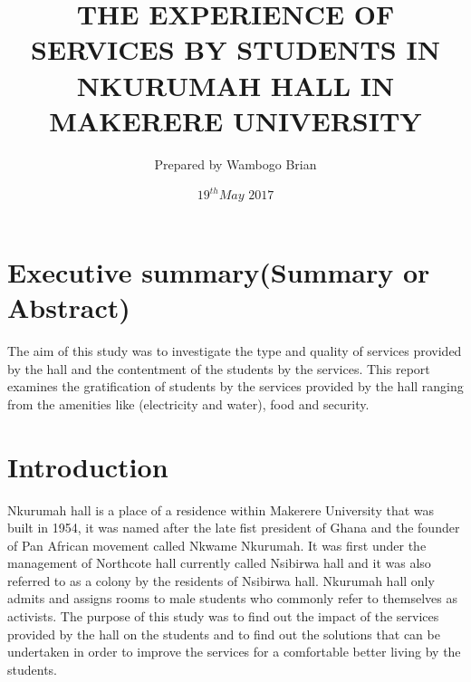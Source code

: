 \documentclass[12pt, a4paper]{article}
\title{THE EXPERIENCE OF SERVICES BY STUDENTS IN NKURUMAH HALL IN MAKERERE UNIVERSITY}
\author{Prepared by Wambogo Brian}
\date{$19^{th} May$ $ 2017$}
\begin{document}
\maketitle
\clearpage
\section{Executive summary(Summary or Abstract)}
The aim of this study was to investigate  the type and quality of services  provided by the hall and the contentment of the students by the services. This report examines the gratification of students by the services provided by the hall ranging from the amenities like (electricity and water), food and security.
\section{Introduction}
Nkurumah hall is a place of a residence within Makerere University that was built in 1954, it was named after the late fist president of Ghana and the founder of Pan African movement called Nkwame Nkurumah. It was first under the management of Northcote hall currently called Nsibirwa hall and it was also referred to as a colony by the residents of Nsibirwa hall. Nkurumah hall only admits and assigns rooms to male students who commonly refer to themselves as activists. The purpose of this study was to find out the impact of the services provided by the hall on the students and to find out the solutions that can be undertaken in order to improve the services for a comfortable better living by the students.
\end{document}
